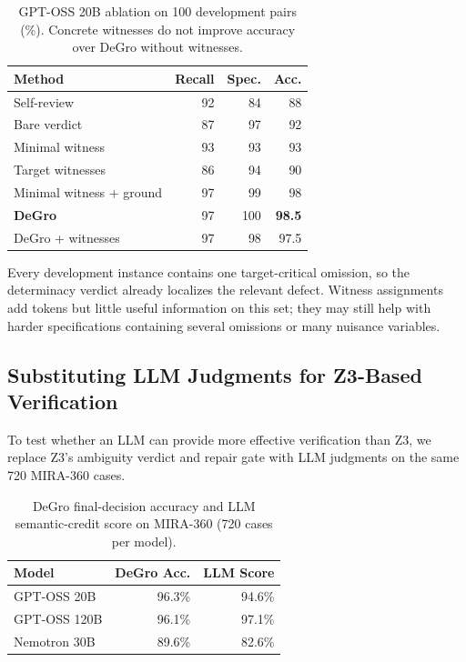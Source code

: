 \documentclass[sigconf,anonymous]{aamas}
\begin{document}
\begin{table}[t]
\centering
\caption{GPT-OSS 20B ablation on 100 development pairs (\%). Concrete witnesses do not improve accuracy over DeGro without witnesses.}
\label{tab:ablation}
\setlength{\tabcolsep}{5pt}
\renewcommand{\arraystretch}{1.05}
\begin{tabular}{lrrr}
\toprule
\textbf{Method} & \textbf{Recall} & \textbf{Spec.} & \textbf{Acc.}\\
\midrule
Self-review              & 92 & 84  & 88\\
Bare verdict             & 87 & 97  & 92\\
Minimal witness          & 93 & 93  & 93\\
Target witnesses         & 86 & 94  & 90\\
Minimal witness + ground & 97 & 99  & 98\\
\rowcolor{degrotableblue}
\textbf{DeGro}           & 97 & 100 & \textbf{98.5}\\
DeGro + witnesses        & 97 & 98  & 97.5\\
\bottomrule
\end{tabular}
\end{table}

Every development instance contains one target-critical omission, so the determinacy verdict already localizes the relevant defect. Witness assignments add tokens but little useful information on this set; they may still help with harder specifications containing several omissions or many nuisance variables.

\subsection{Substituting LLM Judgments for Z3-Based Verification}
To test whether an LLM can provide more effective verification than Z3, we replace Z3's ambiguity verdict and repair gate with LLM judgments on the same 720 MIRA-360 cases.

\begin{table}[t]
\centering
\caption{DeGro final-decision accuracy and LLM semantic-credit score on MIRA-360 (720 cases per model).}
\label{tab:llm_verifier}
\setlength{\tabcolsep}{5pt}
\renewcommand{\arraystretch}{1.05}
\begin{tabular}{@{}lrr@{}}
\toprule
\textbf{Model} & \textbf{DeGro Acc.} & \textbf{LLM Score}\\
\midrule
GPT-OSS 20B & 96.3\% & 94.6\%\\
GPT-OSS 120B & 96.1\% & 97.1\%\\
Nemotron 30B & 89.6\% & 82.6\%\\
\bottomrule
\end{tabular}
\end{table}
\end{document}
